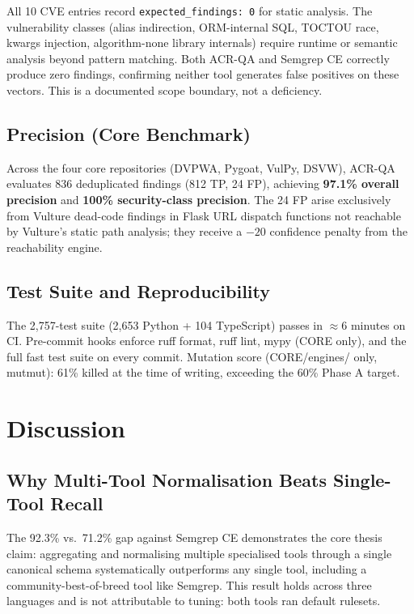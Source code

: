 \documentclass[conference]{IEEEtran}
\begin{document}
All 10 CVE entries record \texttt{expected\_findings: 0} for static analysis. The vulnerability classes (alias indirection, ORM-internal SQL, TOCTOU race, kwargs injection, algorithm-none library internals) require runtime or semantic analysis beyond pattern matching. Both ACR-QA and Semgrep CE correctly produce zero findings, confirming neither tool generates false positives on these vectors. This is a documented scope boundary, not a deficiency.

\subsection{Precision (Core Benchmark)}

Across the four core repositories (DVPWA, Pygoat, VulPy, DSVW), ACR-QA evaluates 836 deduplicated findings (812 TP, 24 FP), achieving \textbf{97.1\% overall precision} and \textbf{100\% security-class precision}. The 24 FP arise exclusively from Vulture dead-code findings in Flask URL dispatch functions not reachable by Vulture's static path analysis; they receive a $-20$ confidence penalty from the reachability engine.

\subsection{Test Suite and Reproducibility}

The 2,757-test suite (2,653 Python + 104 TypeScript) passes in $\approx$6 minutes on CI. Pre-commit hooks enforce ruff format, ruff lint, mypy (CORE only), and the full fast test suite on every commit. Mutation score (CORE/engines/ only, mutmut): 61\% killed at the time of writing, exceeding the 60\% Phase A target.

\section{Discussion}
\label{sec:discussion}

\subsection{Why Multi-Tool Normalisation Beats Single-Tool Recall}

The 92.3\% vs.\ 71.2\% gap against Semgrep CE demonstrates the core thesis claim: aggregating and normalising multiple specialised tools through a single canonical schema systematically outperforms any single tool, including a community-best-of-breed tool like Semgrep. This result holds across three languages and is not attributable to tuning: both tools ran default rulesets.
\end{document}
